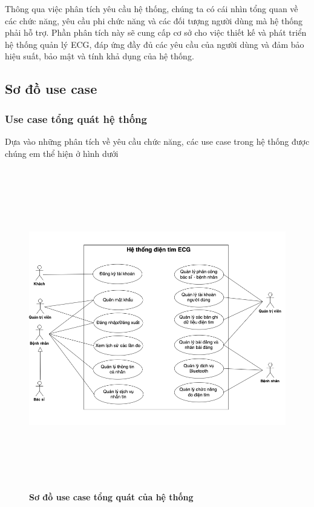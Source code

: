 Thông qua việc phân tích yêu cầu hệ thống, chúng ta có cái nhìn tổng quan về các chức năng, yêu cầu phi chức năng và 
các đối tượng người dùng mà hệ thống phải hỗ trợ. Phần phân tích này sẽ cung cấp cơ sở cho việc thiết kế và phát triển hệ thống quản lý ECG, 
đáp ứng đầy đủ các yêu cầu của người dùng và đảm bảo hiệu suất, bảo mật và tính khả dụng của hệ thống.

\subsection{Sơ đồ use case}
\subsubsection{Use case tổng quát hệ thống}
Dựa vào những phân tích về yêu cầu chức năng, các use case trong hệ thống được chúng em thể hiện ở hình dưới 
  \begin{figure}[H]
    \centering
    \includegraphics[width=16cm,height=14cm]{Images/use_case/use_case_general.png}
    \caption[Sơ đồ use case tổng quát của hệ thống]{\bfseries \fontsize{12pt}{0pt}
    \selectfont Sơ đồ use case tổng quát của hệ thống}
    \label{use_case_general} %
  \end{figure}

